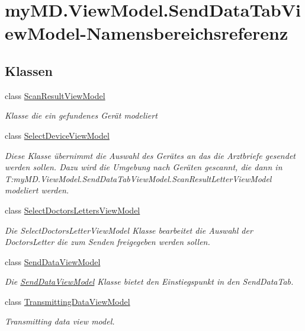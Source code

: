 \hypertarget{namespacemy_m_d_1_1_view_model_1_1_send_data_tab_view_model}{}\section{my\+M\+D.\+View\+Model.\+Send\+Data\+Tab\+View\+Model-\/\+Namensbereichsreferenz}
\label{namespacemy_m_d_1_1_view_model_1_1_send_data_tab_view_model}
\subsection*{Klassen}
\begin{DoxyCompactItemize}
\item 
class \mbox{\hyperlink{classmy_m_d_1_1_view_model_1_1_send_data_tab_view_model_1_1_scan_result_view_model}{Scan\+Result\+View\+Model}}
\begin{DoxyCompactList}\small\item\em Klasse die ein gefundenes Gerät modeliert \end{DoxyCompactList}\item 
class \mbox{\hyperlink{classmy_m_d_1_1_view_model_1_1_send_data_tab_view_model_1_1_select_device_view_model}{Select\+Device\+View\+Model}}
\begin{DoxyCompactList}\small\item\em Diese Klasse übernimmt die Auswahl des Gerätes an das die Arztbriefe gesendet werden sollen. Dazu wird die Umgebung nach Geräten gescannt, die dann in T\+:my\+M\+D.\+View\+Model.\+Send\+Data\+Tab\+View\+Model.\+Scan\+Result\+Letter\+View\+Model modeliert werden. \end{DoxyCompactList}\item 
class \mbox{\hyperlink{classmy_m_d_1_1_view_model_1_1_send_data_tab_view_model_1_1_select_doctors_letters_view_model}{Select\+Doctors\+Letters\+View\+Model}}
\begin{DoxyCompactList}\small\item\em Die Select\+Doctors\+Letter\+View\+Model Klasse bearbeitet die Auswahl der Doctors\+Letter die zum Senden freigegeben werden sollen. \end{DoxyCompactList}\item 
class \mbox{\hyperlink{classmy_m_d_1_1_view_model_1_1_send_data_tab_view_model_1_1_send_data_view_model}{Send\+Data\+View\+Model}}
\begin{DoxyCompactList}\small\item\em Die \mbox{\hyperlink{classmy_m_d_1_1_view_model_1_1_send_data_tab_view_model_1_1_send_data_view_model}{Send\+Data\+View\+Model}} Klasse bietet den Einstiegspunkt in den Send\+Data\+Tab. \end{DoxyCompactList}\item 
class \mbox{\hyperlink{classmy_m_d_1_1_view_model_1_1_send_data_tab_view_model_1_1_transmitting_data_view_model}{Transmitting\+Data\+View\+Model}}
\begin{DoxyCompactList}\small\item\em Transmitting data view model. \end{DoxyCompactList}\end{DoxyCompactItemize}

